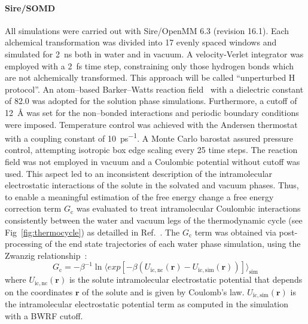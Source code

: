 \documentclass[journal=jctcce,manuscript=article]{achemso}
\begin{document}
\paragraph{Sire/SOMD} All simulations were carried out with
Sire/OpenMM 6.3 (revision 16.1). %
Each alchemical transformation was
divided into 17 evenly spaced windows and simulated for \SI{2}{ns}
both in water and in vacuum. A velocity-Verlet integrator was
employed with a \SI{2}{fs} time step, constraining only those hydrogen bonds
which are not alchemically transformed.  This approach will be called 
``unperturbed H protocol''.
An atom--based
Barker--Watts reaction field~\cite{doi:10.1080/00268977300102101} with
a dielectric constant of \num{82.0} was adopted for the solution phase
simulations. %
Furthermore, a cutoff of \SI{12}{\angstrom} was set for the non--bonded
interactions and periodic boundary conditions were imposed. %
Temperature control was achieved with the Andersen
thermostat~\cite{doi:10.1063/1.439486} with a coupling constant of
\SI{10}{ps^{-1}}.  A Monte Carlo barostat assured pressure control,
attempting isotropic box edge scaling every 25 time steps.
The reaction field was not employed in vacuum and a Coulombic potential without 
cutoff was used.  This aspect led to an inconsistent description of the 
intramolecular electrostatic interactions of the solute in the solvated and 
vacuum phases.  Thus, to enable a meaningful estimation of the free energy 
change a free energy correction term $G_{\mathrm{c}}$ was
evaluated to treat intramolecular Coulombic interactions consistently
between the water and vacuum legs of the thermodynamic cycle (see 
Fig~\ref{fig:thermocycle}) as detailled in Ref.~. The 
$G_{\mathrm{c}}$ term was obtained via post-processing of the end state 
trajectories of each water phase simulation, using the Zwanzig 
relationship~\cite{zwanzig_high-temperature_1954}:
\begin{equation}
 \label{eq:ZwanzigDGfunc}
 G_{\mathrm{c}} = -\beta^{-1} \ln \langle exp 
 \left[-\beta(U_{\mathrm{ic,nc}}(\mathbf{r}) - 
 U_{\mathrm{ic,sim}}(\mathbf{r}))\right]\rangle_{\mathrm{sim}}
\end{equation}
where $U_{\mathrm{ic,nc}}(\mathbf{r})$ is the solute intramolecular 
electrostatic %
potential that depends on the coordinates $\mathbf{r}$ of the solute and is given by Coulomb's law. 
$U_{\mathrm{ic,sim}}(\mathbf{r})$ is the intramolecular electrostatic potential term as
computed in the simulation with a BWRF cutoff.
\end{document}
